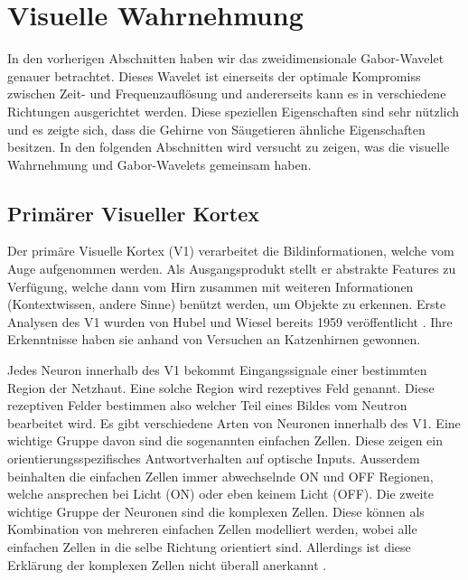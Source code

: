 \section{Visuelle Wahrnehmung}

In den vorherigen Abschnitten haben wir das zweidimensionale Gabor-Wavelet genauer betrachtet.
Dieses Wavelet ist einerseits der optimale Kompromiss zwischen Zeit- und Frequenzauflösung und andererseits kann es in verschiedene Richtungen ausgerichtet werden.
Diese speziellen Eigenschaften sind sehr nützlich und es zeigte sich, dass die Gehirne von Säugetieren ähnliche Eigenschaften besitzen.
In den folgenden Abschnitten wird versucht zu zeigen, was die visuelle Wahrnehmung und Gabor-Wavelets gemeinsam haben. 

\subsection{Primärer Visueller Kortex}\label{subsec:v1}

Der primäre Visuelle Kortex (V1) verarbeitet die Bildinformationen, welche vom Auge aufgenommen werden.
%
Als Ausgangsprodukt stellt er abstrakte Features zu Verfügung, welche dann vom Hirn zusammen mit weiteren Informationen (Kontextwissen, andere Sinne)  benützt werden, um Objekte zu erkennen.
Erste Analysen des V1 wurden von Hubel und Wiesel bereits 1959 veröffentlicht \cite{paper:hubelwiesel}.
Ihre Erkenntnisse haben sie anhand von Versuchen an Katzenhirnen gewonnen.

Jedes Neuron innerhalb des V1 bekommt Eingangssignale einer bestimmten Region der Netzhaut.
Eine solche Region wird rezeptives Feld genannt.
Diese rezeptiven Felder bestimmen also welcher Teil eines Bildes vom Neutron bearbeitet wird.
Es gibt verschiedene Arten von Neuronen innerhalb des V1.
Eine wichtige Gruppe davon sind die sogenannten einfachen Zellen.
%
Diese zeigen ein orientierungsspezifisches Antwortverhalten auf optische Inputs.
Ausserdem beinhalten die einfachen Zellen immer abwechselnde ON und OFF Regionen, welche ansprechen bei Licht (ON) oder eben keinem Licht (OFF).
Die zweite wichtige Gruppe der Neuronen sind die komplexen Zellen.
%
Diese können als Kombination von mehreren einfachen Zellen modelliert werden, wobei alle einfachen Zellen in die selbe Richtung orientiert sind.
Allerdings ist diese Erklärung der komplexen Zellen nicht überall anerkannt \cite{book:neuroscience}.


